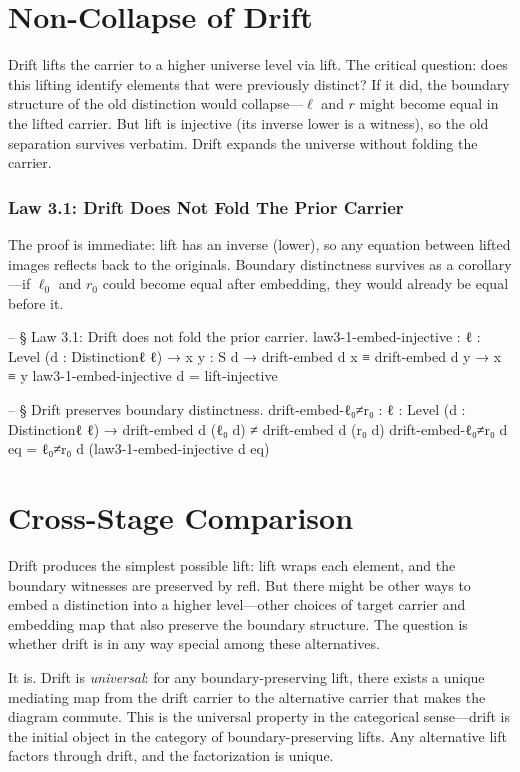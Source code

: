 \documentclass[11pt,a4paper]{book}
\def\texttt#1{#1}%
\begin{document}
\chapter{Non-Collapse of Drift}

Drift lifts the carrier to a higher universe level via \texttt{lift}. The critical question: does this lifting identify elements that were previously distinct? If it did, the boundary structure of the old distinction would collapse—$\ell$ and $r$ might become equal in the lifted carrier. But \texttt{lift} is injective (its inverse \texttt{lower} is a witness), so the old separation survives verbatim. Drift expands the universe without folding the carrier.

\subsection{Law 3.1: Drift Does Not Fold The Prior Carrier}

The proof is immediate: \texttt{lift} has an inverse (\texttt{lower}), so any equation between lifted images reflects back to the originals.
Boundary distinctness survives as a corollary---if $\ell_0$ and $r_0$ could become equal after embedding, they would already be equal before it.

\begin{code}
-- § Law 3.1: Drift does not fold the prior carrier.
law3-1-embed-injective :
  {ℓ : Level} (d : Distinctionℓ ℓ) → {x y : S d} →
  drift-embed d x ≡ drift-embed d y → x ≡ y
law3-1-embed-injective d = lift-injective

-- § Drift preserves boundary distinctness.
drift-embed-ℓ₀≠r₀ :
  {ℓ : Level} (d : Distinctionℓ ℓ) →
  drift-embed d (ℓ₀ d) ≠ drift-embed d (r₀ d)
drift-embed-ℓ₀≠r₀ d eq = ℓ₀≠r₀ d (law3-1-embed-injective d eq)
\end{code}

\chapter{Cross-Stage Comparison}

Drift produces the simplest possible lift: \texttt{lift} wraps each element, and the boundary witnesses are preserved by \texttt{refl}. But there might be other ways to embed a distinction into a higher level—other choices of target carrier and embedding map that also preserve the boundary structure. The question is whether drift is in any way special among these alternatives.

It is. Drift is \textit{universal}: for any boundary-preserving lift, there exists a unique mediating map from the drift carrier to the alternative carrier that makes the diagram commute. This is the universal property in the categorical sense—drift is the initial object in the category of boundary-preserving lifts. Any alternative lift factors through drift, and the factorization is unique.
\end{document}
